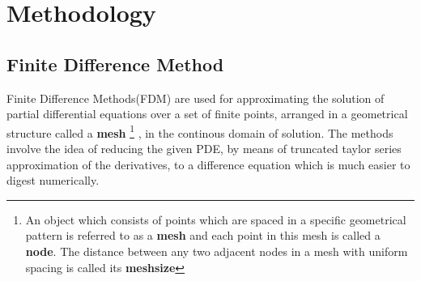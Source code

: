 %
\section{Methodology}
\subsection{Finite Difference Method}
Finite Difference Methods(FDM) are used for approximating the solution of partial differential equations over a set of finite points, arranged in a geometrical structure called a \textbf{mesh}%
\footnote[1]{An object which consists of points which are spaced in a specific geometrical pattern is referred to as a \textbf{mesh} and each point in this mesh is called a \textbf{node}. The distance between any two adjacent nodes in a mesh with uniform spacing is called its \textbf{meshsize}}%
, in the continous domain of solution. The methods involve the idea of reducing the given PDE, by means of truncated taylor series approximation of the derivatives, to a difference equation which is much easier to digest numerically. 
